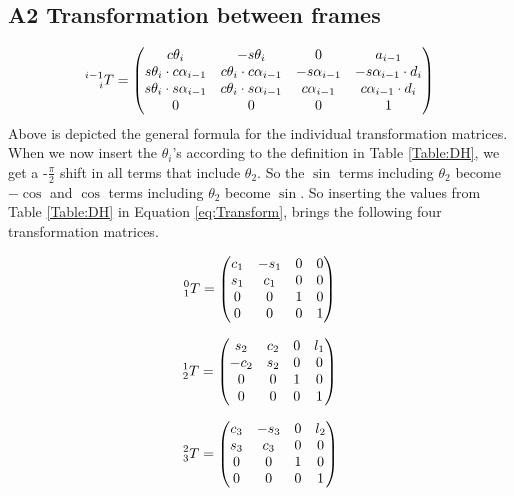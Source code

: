 \subsection{A2 Transformation between frames}
\begin{equation}
   \prescript{i-1}{i}{T} = \begin{pmatrix} 
   c\theta_i & -s\theta_i & 0 & a_{i-1}\\
   s\theta_i\cdot c\alpha_{i-1} & c\theta_i\cdot c\alpha_{i-1}& -s\alpha_{i-1}& -s\alpha_{i-1}\cdot d_i\\
   s\theta_i\cdot s\alpha_{i-1}& c\theta_i\cdot s\alpha_{i-1} &c\alpha_{i-1}&  c\alpha_{i-1}\cdot d_i       \\
   0 & 0 & 0 & 1\end{pmatrix}
   \label{eq:Transform}
\end{equation}
Above is depicted the general formula for the individual transformation matrices. 
When we now insert the $\theta_i$'s according to the definition in Table \ref{Table:DH}, we get a -$\frac{\pi}{2}$ shift in all terms that include $\theta_2$. So the $\sin$ terms including $\theta_2$ become $-\cos$ and $\cos$ terms including $\theta_2$ become $\sin$. So inserting the values from Table \ref{Table:DH} in Equation \ref{eq:Transform}, brings the following four transformation matrices. 

\begin{equation}
   \prescript{0}{1}{T} = \begin{pmatrix} 
  c_1 & -s_1 & 0 & 0\\
   s_1 & c_1 & 0& 0\\
   0& 0 & 1 &  0       \\
   0 & 0 & 0 & 1\end{pmatrix}
   \label{eq:T01}
\end{equation}

\begin{equation}
   \prescript{1}{2}{T} = \begin{pmatrix} 
  s_2 & c_2 & 0 & l_1\\
   -c_2 & s_2 & 0& 0\\
   0& 0 & 1 &  0       \\
   0 & 0 & 0 & 1\end{pmatrix}
   \label{eq:T12}
\end{equation}

\begin{equation}
   \prescript{2}{3}{T} = \begin{pmatrix} 
  c_3 & -s_3 & 0 & l_2\\
   s_3 & c_3 & 0& 0\\
   0& 0 & 1 &  0       \\
   0 & 0 & 0 & 1\end{pmatrix}
   \label{eq:T23}
\end{equation}

